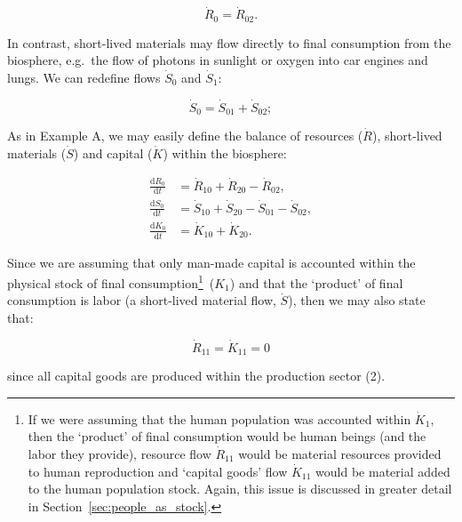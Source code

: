 \begin{equation}\label{eq:B_R0}
	\dot{R}_{0} = \dot{R}_{02}.
\end{equation}

In contrast, 
short-lived materials may flow directly to final consumption 
from the biosphere, 
e.g.\ the flow of photons in sunlight or oxygen into car engines and lungs. 
We can redefine flows $\dot{S}_{0}$ and $\dot{S}_{1}$:

\begin{equation}\label{eq:B_S0}
	\dot{S}_{0} 
	= \dot{S}_{01} + \dot{S}_{02};
\end{equation}

As in Example A, we may easily define 
the balance of resources ($\dot{R}$),
short-lived materials ($\dot{S}$) and
capital ($\dot{K}$) within the biosphere:

\begin{align}\label{eq:B_dR0}
	\frac{\mathrm{d}R_{0}}{\mathrm{d}t}	&
	= \dot{R}_{10}
	+ \dot{R}_{20}
	- \dot{R}_{02},										\\
\label{eq:B_dS0}
	\frac{\mathrm{d}S_{0}}{\mathrm{d}t}	&
	= \dot{S}_{10}
	+ \dot{S}_{20}
	- \dot{S}_{01}
	- \dot{S}_{02},										\\	
\label{eq:B_dK0}
	\frac{\mathrm{d}K_{0}}{\mathrm{d}t}	&
	= \dot{K}_{10}
	+ \dot{K}_{20}.
\end{align}

Since we are assuming that only man-made capital
is accounted within the physical stock of final consumption\footnote{If
we were assuming that the human population
was accounted within $\dot{K}_{1}$,
then the `product' of final consumption would be human beings
(and the labor they provide),
resource flow $\dot{R}_{11}$ would be material resources
provided to human reproduction and
`capital goods' flow $\dot{K}_{11}$ would be material
added to the human population stock. Again, 
this issue is discussed in greater detail in 
Section~\ref{sec:people_as_stock}.}~($K_{1}$)
and that the `product' of final consumption is labor
(a short-lived material flow, $\dot{S}$),
then we may also state that:

\begin{equation}\label{eq:B_R11_K11}
	\dot{R}_{11} = \dot{K}_{11} = 0
\end{equation}

\noindent{}since all capital goods are produced within
the production sector (2).


